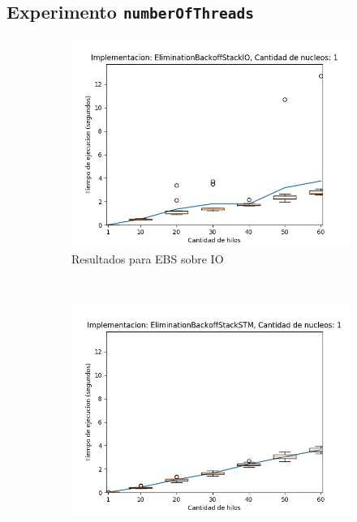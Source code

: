 \begin{appendices}
\section{Experimento \texttt{numberOfThreads}}
\begin{figure}[H]
    \centering
    \begin{subfigure}[b]{0.49\textwidth}
        \includegraphics[width=\textwidth]{images/numberOfThreads/plots/expEBSIO-1}
        \caption{Resultados para EBS sobre IO}
        \label{subfig:numberOfThreads-ebsio-1}
    \end{subfigure}
    ~
    \begin{subfigure}[b]{0.49\textwidth}
        \includegraphics[width=\textwidth]{images/numberOfThreads/plots/expEBSSTM-1}

\end{subfigure}
\end{figure}
\end{appendices}
